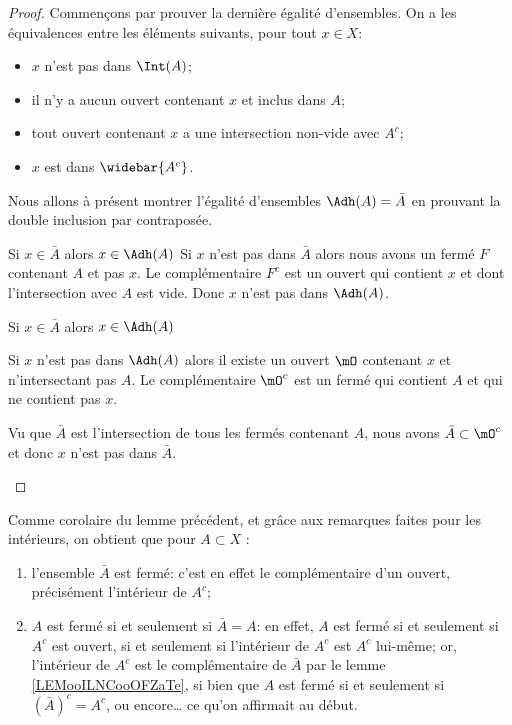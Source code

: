 \begin{proof}
    Commençons par prouver la dernière égalité d'ensembles. On a les équivalences entre les éléments suivants, pour tout $x \in X$:
    \begin{itemize}
    \item $x$ n'est pas dans $\Int(A)$;
    \item il n'y a aucun ouvert contenant $x$ et inclus dans $A$;
    \item tout ouvert contenant $x$ a une intersection non-vide avec $A^c$;
    \item $x$ est dans $\widebar{A^c}$.
    \end{itemize}
    Nous allons à présent montrer l'égalité d'ensembles \( \Adh(A)=\bar A \) en prouvant la double inclusion par contraposée.
    \begin{subproof}
        \item[Si \( x\in \bar A\) alors \( x\in\Adh(A)\)]
            Si \( x\) n'est pas dans \( \bar A\) alors nous avons un fermé \( F\) contenant \( A\) et pas \( x\). Le complémentaire \( F^c\) est un ouvert qui contient \( x\) et dont l'intersection avec \( A\) est vide. Donc \( x\) n'est pas dans \( \Adh(A)\).

        \item[Si \( x\in\bar A\) alors \( x\in \Adh(A)\)]

            Si \( x\) n'est pas dans \( \Adh(A)\) alors il existe un ouvert \( \mO\) contenant \( x\) et n'intersectant pas \( A\). Le complémentaire \( \mO^c\) est un fermé qui contient \( A\) et qui ne contient pas \( x\).

            Vu que \( \bar A\) est l'intersection de tous les fermés contenant \( A\), nous avons \( \bar A\subset\mO^c\) et donc \( x\) n'est pas dans \( \bar A\).
    \end{subproof}
\end{proof}

\begin{remark}\label{RemAdhFerme}
  Comme corolaire du lemme précédent, et grâce aux remarques faites pour les intérieurs, on obtient que pour \( A \subset X \) :
  \begin{enumerate}
  \item l'ensemble \( \bar A \) est fermé: c'est en effet le complémentaire d'un ouvert, précisément l'intérieur de \( A^c \);
  \item \( A \) est fermé si et seulement si \( \bar A = A \): en effet, \( A \) est fermé si et seulement si \( A^c \) est ouvert, si et seulement si l'intérieur de \( A^c \) est \( A^c \) lui-même; or, l'intérieur de \( A^c \) est le complémentaire de \( \bar A \) par le lemme \ref{LEMooILNCooOFZaTe}, si bien que \( A \) est fermé si et seulement si \( (\bar A)^c  = A^c \), ou encore\dots{} ce qu'on affirmait au début.
  \end{enumerate}
\end{remark}

